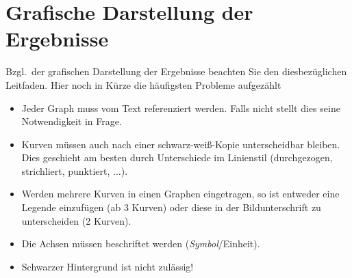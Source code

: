 \documentclass[a4paper, ngerman, oneside, 10pt]{article}
\begin{document}
\section{Grafische Darstellung der Ergebnisse}

Bzgl.~der grafischen Darstellung der Ergebnisse beachten Sie den diesbezüglichen Leitfaden. Hier noch in Kürze die häufigsten Probleme aufgezählt
\begin{itemize}
	\item Jeder Graph muss vom Text referenziert werden. Falls nicht stellt dies seine Notwendigkeit in Frage.
	\item Kurven müssen auch nach einer schwarz-weiß-Kopie unterscheidbar bleiben. Dies geschieht am besten durch Unterschiede im Linienstil (durchgezogen, strichliert, punktiert, $\ldots$).
	\item Werden mehrere Kurven in einen Graphen eingetragen, so ist entweder eine Legende einzufügen (ab 3 Kurven) oder diese in der Bildunterschrift zu unterscheiden (2 Kurven).
	\item Die Achsen müssen beschriftet werden (\textit{Symbol}/Einheit).
	\item Schwarzer Hintergrund ist nicht zulässig!
\end{itemize}

\newpage
\end{document}
